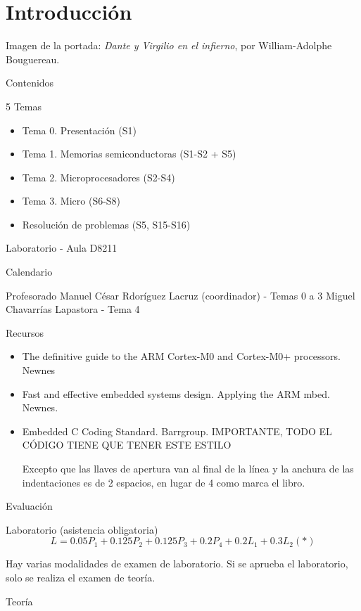 \documentclass[a4paper]{book}
\begin{document}
\begin{figure}[t!]
\begin{subfigure}[b]{0.25\linewidth}
	\end{subfigure}
\end{figure}

\newpage
{}
{}
\section*{Introducción}
Imagen de la portada: \textsl{Dante y Virgilio en el infierno}, por William-Adolphe Bouguereau.

Contenidos 

5 Temas

\begin{itemize}
	 \item Tema 0. Presentación (S1)
	 \item Tema 1. Memorias semiconductoras (S1-S2 + S5)
	 \item Tema 2. Microprocesadores (S2-S4)
	 \item Tema 3. Micro (S6-S8)
	 \item Resolución de problemas (S5, S15-S16)
\end{itemize}

Laboratorio - Aula D8211

Calendario

Profesorado
Manuel César Rdoríguez Lacruz (coordinador) - Temas 0 a 3
Miguel Chavarrías Lapastora - Tema 4

Recursos
\begin{itemize}
	 \item The definitive guide to the ARM Cortex-M0 and Cortex-M0+ processors. Newnes
	 \item Fast and effective embedded systems design. Applying the ARM mbed. Newnes.
	 \item Embedded C Coding Standard. Barrgroup. IMPORTANTE, TODO EL CÓDIGO TIENE QUE TENER ESTE ESTILO
	 
	 Excepto que las llaves de apertura van al final de la línea y la anchura de las indentaciones es de 2 espacios, en lugar de 4 como marca el libro.
\end{itemize}

Evaluación

Laboratorio (asistencia obligatoria)
\[ L = 0.05P_1 + 0.125P_2 + 0.125P_3 +0.2P_4 + 0.2L_1 + 0.3L_2 (*)\]

Hay varias modalidades de examen de laboratorio. Si se aprueba el laboratorio, solo se realiza el examen de teoría.

Teoría
\end{document}
